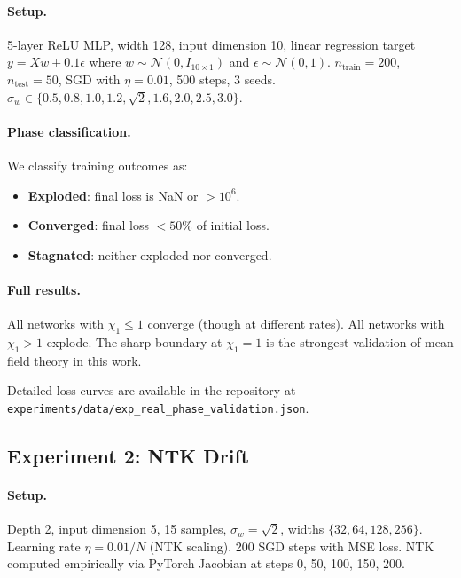 \documentclass[10pt]{article}
\theoremstyle{definition}
\begin{document}
\paragraph{Setup.} 5-layer ReLU MLP, width 128, input dimension 10, linear regression target $y = Xw + 0.1\epsilon$ where $w \sim \mathcal{N}(0, I_{10 \times 1})$ and $\epsilon \sim \mathcal{N}(0, 1)$.
$n_{\text{train}} = 200$, $n_{\text{test}} = 50$, SGD with $\eta = 0.01$, 500 steps, 3 seeds.
$\sigma_w \in \{0.5, 0.8, 1.0, 1.2, \sqrt{2}, 1.6, 2.0, 2.5, 3.0\}$.

\paragraph{Phase classification.}
We classify training outcomes as:
\begin{itemize}[nosep]
  \item \textbf{Exploded}: final loss is NaN or $>10^6$.
  \item \textbf{Converged}: final loss $< 50\%$ of initial loss.
  \item \textbf{Stagnated}: neither exploded nor converged.
\end{itemize}

\paragraph{Full results.}
All networks with $\chi_1 \leq 1$ converge (though at different rates).
All networks with $\chi_1 > 1$ explode.
The sharp boundary at $\chi_1 = 1$ is the strongest validation of mean field theory in this work.

Detailed loss curves are available in the repository at\\
\texttt{experiments/data/exp\_real\_phase\_validation.json}.

\subsection{Experiment 2: NTK Drift}

\paragraph{Setup.} Depth 2, input dimension 5, 15 samples, $\sigma_w = \sqrt{2}$, widths $\{32, 64, 128, 256\}$.
Learning rate $\eta = 0.01/N$ (NTK scaling).
200 SGD steps with MSE loss.
NTK computed empirically via PyTorch Jacobian at steps 0, 50, 100, 150, 200.
\end{document}
